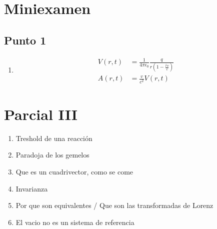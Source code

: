 \documentclass[12pt]{amsart}
\begin{document}
  \section{Miniexamen}

  \subsection{Punto 1}
  \begin{enumerate}
    \item 
      \begin{align*}
        V(r, t) &= \frac{1}{4\pi\epsilon_0} \frac{q}{r(1 - \frac{\hat{r}v}{c})}\\
        A(r, t) &= \frac{v}{c^2} V(r, t)
      \end{align*}
  \end{enumerate}

  \section{Parcial III}

  \begin{enumerate}
    \item Treshold de una reacción
    \item Paradoja de los gemelos
    \item Que es un cuadrivector, como se come
    \item Invarianza
    \item Por que son equivalentes / Que son las transformadas de Lorenz
    \item El vacio no es un sistema de referencia
  \end{enumerate}
\end{document}
